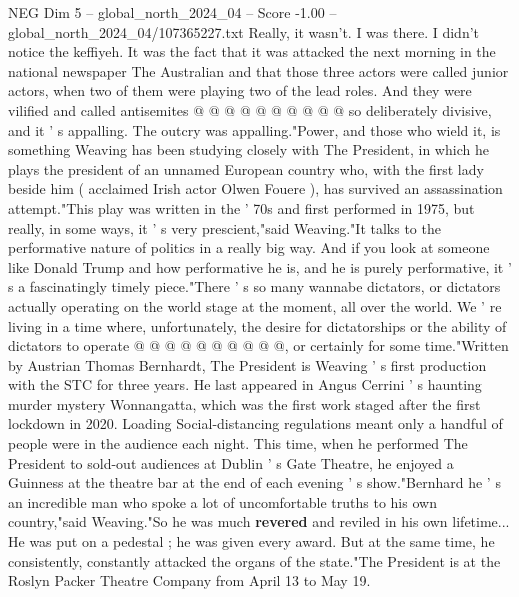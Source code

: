 \begin{textsample}{NEG Dim 5 – global\_north\_2024\_04 – Score -1.00 – global\_north\_2024\_04/107365227.txt}
Really, it wasn't.
I was there.
I didn't notice the keffiyeh.
It was the fact that it was attacked the next morning in the national newspaper The Australian and that those three actors were called junior actors, when two of them were playing two of the lead roles.
And they were vilified and called antisemites @ @ @ @ @ @ @ @ @ @ so deliberately divisive, and it ' s appalling.
The outcry was appalling."Power, and those who wield it, is something Weaving has been studying closely with The President, in which he plays the president of an unnamed European country who, with the first lady beside him ( acclaimed Irish actor Olwen Fouere ), has survived an assassination attempt."This play was written in the ' 70s and first performed in 1975, but really, in some ways, it ' s very prescient,"said Weaving."It talks to the performative nature of politics in a really big way.
And if you look at someone like Donald Trump and how performative he is, and he is purely performative, it ' s a fascinatingly timely piece."There ' s so many wannabe dictators, or dictators actually operating on the world stage at the moment, all over the world.
We ' re living in a time where, unfortunately, the desire for dictatorships or the ability of dictators to operate @ @ @ @ @ @ @ @ @ @, or certainly for some time."Written by Austrian Thomas Bernhardt, The President is Weaving ' s first production with the STC for three years.
He last appeared in Angus Cerrini ' s haunting murder mystery Wonnangatta, which was the first work staged after the first lockdown in 2020.
Loading Social-distancing regulations meant only a handful of people were in the audience each night.
This time, when he performed The President to sold-out audiences at Dublin ' s Gate Theatre, he enjoyed a Guinness at the theatre bar at the end of each evening ' s show."Bernhard he ' s an incredible man who spoke a lot of uncomfortable truths to his own country,"said Weaving."So he was much \textbf{revered} and reviled in his own lifetime...
He was put on a pedestal ; he was given every award.
But at the same time, he consistently, constantly attacked the organs of the state."The President is at the Roslyn Packer Theatre Company from April 13 to May 19.

\end{textsample}
